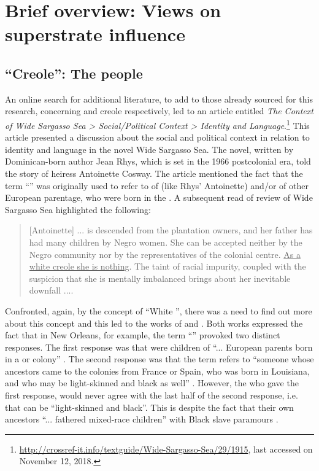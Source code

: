 \chapter{Brief overview: Views on superstrate influence}\label{ch:2}

 \section {``{Creole}'': The people} \label{2.1}
 An online search for additional literature, to add to those already sourced for this research, concerning  and creole  respectively, led to an article entitled \textit{The Context of Wide Sargasso Sea > Social\slash Political Context >  Identity and Language}.\footnote{\url{http://crossref-it.info/textguide/Wide-Sargasso-Sea/29/1915}, last accessed on November 12, 2018.} This article presented a discussion about the social and political context in relation to  identity and language in the novel Wide Sargasso Sea. The novel, written by Dominican-born author Jean Rhys, which is set in the 1966 postcolonial era, told the story of heiress Antoinette Cosway. The article mentioned the fact that the term ``'' was originally used to refer to  of  (like Rhys' Antoinette) and/or of other European parentage, who were born in the . A subsequent read of   review of Wide Sargasso Sea highlighted the following:
 
  \begin{quotation}
[Antoinette] ... is descended from the plantation owners, and her father has had many children by Negro women. She can be accepted neither by the Negro community nor by the representatives of the colonial centre. \underline {As a white creole she is nothing}. The taint of racial impurity, coupled with the suspicion that she is mentally imbalanced brings about her inevitable downfall .... 
\end{quotation}

Confronted, again, by the concept of ``White '', there was a need to find out more about this concept and this led to the works of \citet{Saxon89} and \citet{Ward04}. Both works expressed the fact that in New Orleans, for example, the term ``'' provoked two distinct responses. The first response was that  were children of  ``... European parents born in a  or  colony'' \citep[270]{Saxon89}. The second response was that the term refers to ``someone whose ancestors came to the colonies from France or Spain, who was born in Louisiana, and who may be light-skinned and black as well'' \citep[xiv]{Ward04}. However, the  who gave the first response, would never agree with the last half of the second response, i.e. that  can be ``light-skinned and black''. This is despite the fact that their own ancestors ``... fathered mixed-race children'' with Black slave paramours \citep[xiv]{Ward04}.

